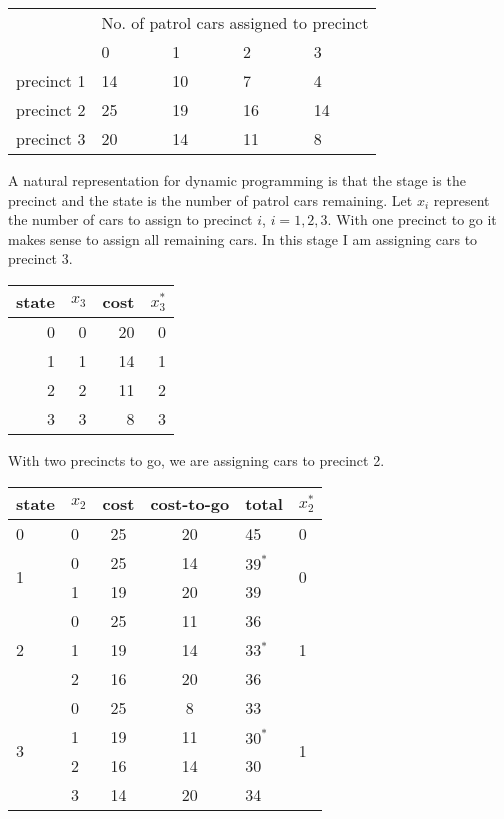\begin{enumerate}
  \begin{center}
  \begin{tabularx}{3.5in}{r|XXXX}
    & \multicolumn{4}{c}{No. of patrol cars assigned to precinct} \\
    &0 & 1 & 2 & 3 \\ \hline
    precinct 1 & 14 & 10 & 7 & 4 \\
    precinct 2 & 25 & 19 & 16 & 14 \\
    precinct 3 & 20 & 14 & 11 & 8
  \end{tabularx}
\end{center}

\begin{solution}
  \bs A natural representation for dynamic programming is that the
  stage is the precinct and the state is the number of patrol cars
  remaining. Let $x_i$ represent the number of cars to assign to
  precinct $i$, $i = 1,2,3$. With one precinct to go it makes sense to
  assign all remaining cars. In this stage I am assigning cars to
  precinct 3.

  \begin{tabular}{rrrr}
    state & $x_3$ & cost & $x_3^{\ast}$ \\ \hline
    0 & 0 & 20 & 0 \\
    1 & 1 & 14 & 1 \\
    2 & 2 & 11 & 2 \\
    3 & 3 & 8 & 3
  \end{tabular}

  With two precincts to go, we are assigning cars to precinct 2.

  \begin{tabular}{llccll}
    state & $x_2$ & cost & cost-to-go & total & $x_2^{\ast}$ \\ \hline
    0 & 0 & 25 & 20 & 45 & 0 \\ \hline

    \multirow{2}{*}{1} & 0 & 25 & 14 & $39^{\ast}$ & \multirow{2}{*}{0} \\
          & 1 & 19 & 20 & 39 &  \\ \hline

    \multirow{3}{*}{2} & 0 & 25 & 11 & 36 & \multirow{3}{*}{1} \\
          & 1 & 19 & 14 & 33$^{\ast}$ &  \\
          & 2 & 16 & 20 & 36 & \\ \hline

    \multirow{4}{*}{3} & 0 & 25 & 8 & 33 & \multirow{4}{*}{1}\\
    & 1 & 19 & 11 & $30^{\ast}$ &  \\
    & 2 & 16 & 14 & 30 & \\
    & 3 & 14 & 20 & 34 & 
  \end{tabular}


\end{solution}
\end{enumerate}
